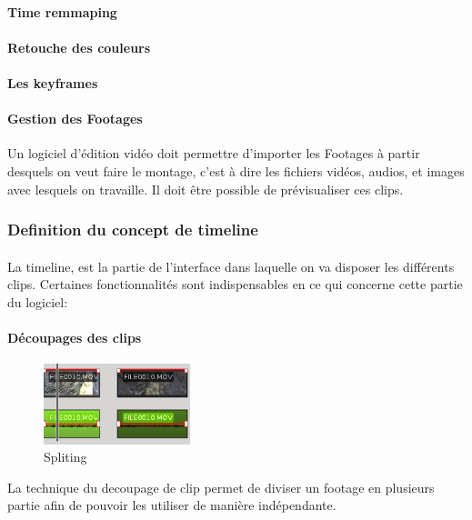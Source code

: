 \paragraph{Time remmaping}
\paragraph{Retouche des couleurs}
\paragraph{Les keyframes}

\paragraph{Gestion des Footages}
Un logiciel d'édition vidéo doit permettre d'importer les Footages à partir %
desquels on veut faire le montage, c'est à dire les fichiers vidéos, audios,
et images avec lesquels on travaille. Il doit être possible de prévisualiser ces
clips.

\subsubsection{Definition du concept de timeline}
\paragraph{}
La timeline, est la partie de l'interface dans laquelle on va disposer les
différents clips. Certaines fonctionnalités sont indispensables en ce qui
concerne cette partie du logiciel:

\newpage
\paragraph{Découpages des clips}
  \begin{figure}
    \vspace{-20pt}
    \begin{center}
      \includegraphics[width=0.38\textwidth]{images/splited}
    \end{center}
    \vspace{-20pt}
    \caption{Spliting}
    \label{No}
  \end{figure}
  La technique du decoupage de clip permet de diviser un footage en plusieurs
  partie afin de pouvoir les utiliser de manière indépendante.

